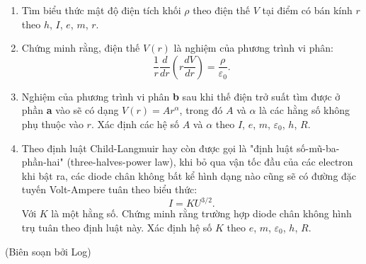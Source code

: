 \begin{enumerate}[label=\textbf{\alph*,}]\itemsep0em

\item Tìm biểu thức mật độ điện tích khối $\rho$ theo điện thế $V$ tại điểm có bán kính $r$ theo $h$, $I$, $e$, $m$, $r$.

\item Chứng minh rằng, điện thế $V(r)$ là nghiệm của phương trình vi phân:
$$\frac{1}{r} \frac{d}{dr} \left( r \frac{dV}{dr} \right) = \frac{\rho}{\varepsilon_0}.$$

\item Nghiệm của phương trình vi phân \textbf{b} sau khi thế điện trở suất tìm được ở phần \textbf{a} vào sẽ có dạng $V(r)=A r^\alpha$, trong đó $A$ và $\alpha$ là các hằng số không phụ thuộc vào $r$. Xác định các hệ số $A$ và $\alpha$ theo $I$, $e$, $m$, $\varepsilon_0$, $h$, $R$.

\item Theo định luật Child-Langmuir hay còn được gọi là "định luật số-mũ-ba-phần-hai" (three-halves-power law), khi bỏ qua vận tốc đầu của các electron khi bật ra, các diode chân không bất kể hình dạng nào cũng sẽ có đường đặc tuyến Volt-Ampere tuân theo biểu thức:
$$ I = K U^{3/2}.$$
Với $K$ là một hằng số. Chứng minh rằng trường hợp diode chân không hình trụ tuân theo định luật này. Xác định hệ số $K$ theo $e$, $m$, $\varepsilon_0$, $h$, $R$.
\end{enumerate}

\begin{flushright}
    (Biên soạn bởi Log)
\end{flushright}
